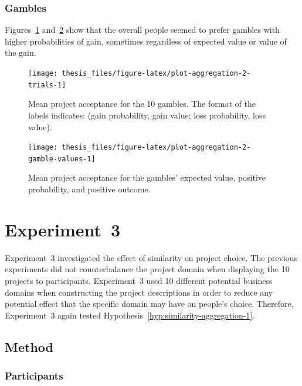 \documentclass[a4paper, nobind, dvipsnames]{templates/ociamthesis}
\theoremstyle{definition}
\theoremstyle{definition}
\theoremstyle{definition}
\theoremstyle{definition}
\theoremstyle{remark}
\begin{document}
\subsubsection{Gambles}

Figures~\ref{fig:plot-aggregation-2-trials}
and~\ref{fig:plot-aggregation-2-gamble-values} show that the overall people
seemed to prefer gambles with higher probabilities of gain, sometimes regardless
of expected value or value of the gain.



\begin{figure}
\texttt{[image: thesis\_files/figure-latex/plot-aggregation-2-trials-1]} \caption{Mean project acceptance for the 10 gambles. The format of the labels indicates: (gain probability, gain value; loss probability, loss value).}\label{fig:plot-aggregation-2-trials}
\end{figure}



\begin{figure}
\texttt{[image: thesis\_files/figure-latex/plot-aggregation-2-gamble-values-1]} \caption{Mean project acceptance for the gambles' expected value, positive probability, and positive outcome.}\label{fig:plot-aggregation-2-gamble-values}
\end{figure}

\hypertarget{aggregation-3}{%
\section{Experiment~3}\label{aggregation-3}}

Experiment~3 investigated the effect of similarity on project choice. The
previous experiments did not counterbalance the project domain when displaying
the 10 projects to participants. Experiment~3 used 10 different potential
business domains when constructing the project descriptions in order to reduce
any potential effect that the specific domain may have on people's choice.
Therefore, Experiment~3 again tested
Hypothesis~\ref{hyp:similarity-aggregation-1}.

\subsection{Method}

\subsubsection{Participants}
\end{document}
